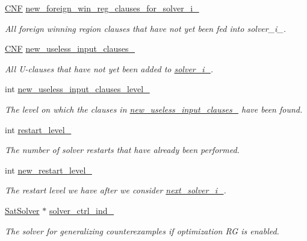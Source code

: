 \begin{DoxyCompactItemize}
\hyperlink{classCNF}{C\-N\-F} \hyperlink{classClauseExplorerSAT_a70c8edd590d75994ee354d591909cd35}{new\-\_\-foreign\-\_\-win\-\_\-reg\-\_\-clauses\-\_\-for\-\_\-solver\-\_\-i\-\_\-}
\begin{DoxyCompactList}\small\item\em All foreign winning region clauses that have not yet been fed into solver\-\_\-i\-\_\-. \end{DoxyCompactList}\item 
\hyperlink{classCNF}{C\-N\-F} \hyperlink{classClauseExplorerSAT_a3d1bdb9a6484c85af655a4eed1ee5f19}{new\-\_\-useless\-\_\-input\-\_\-clauses\-\_\-}
\begin{DoxyCompactList}\small\item\em All U-\/clauses that have not yet been added to \hyperlink{classClauseExplorerSAT_a65b5b3d04ff5be8bfec60d3dcf86e4d0}{solver\-\_\-i\-\_\-}. \end{DoxyCompactList}\item 
int \hyperlink{classClauseExplorerSAT_a67eeafbba9da9c87534f7ef26531a57a}{new\-\_\-useless\-\_\-input\-\_\-clauses\-\_\-level\-\_\-}
\begin{DoxyCompactList}\small\item\em The level on which the clauses in \hyperlink{classClauseExplorerSAT_a3d1bdb9a6484c85af655a4eed1ee5f19}{new\-\_\-useless\-\_\-input\-\_\-clauses\-\_\-} have been found. \end{DoxyCompactList}\item 
int \hyperlink{classClauseExplorerSAT_a0b5d716111026dd1cb4efe5855e2fe2f}{restart\-\_\-level\-\_\-}
\begin{DoxyCompactList}\small\item\em The number of solver restarts that have already been performed. \end{DoxyCompactList}\item 
int \hyperlink{classClauseExplorerSAT_adf9bfe4390d34e57e25f269afa1e7b25}{new\-\_\-restart\-\_\-level\-\_\-}
\begin{DoxyCompactList}\small\item\em The restart level we have after we consider \hyperlink{classClauseExplorerSAT_abbaa9b938df08f811dd361216527176c}{next\-\_\-solver\-\_\-i\-\_\-}. \end{DoxyCompactList}\item 
\hyperlink{classSatSolver}{Sat\-Solver} $\ast$ \hyperlink{classClauseExplorerSAT_aba4c9ed8ccc28d89c094f3cd80157f3f}{solver\-\_\-ctrl\-\_\-ind\-\_\-}
\begin{DoxyCompactList}\small\item\em The solver for generalizing counterexamples if optimization R\-G is enabled. \end{DoxyCompactList}\item 

\end{DoxyCompactItemize}
